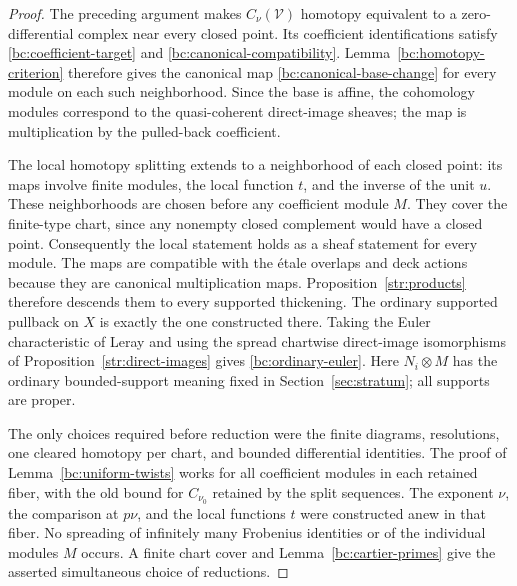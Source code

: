 \begin{proof}
The preceding argument makes $C_\nu(\mathcal V)$ homotopy equivalent
to a zero-differential complex near every closed point.  Its
coefficient identifications satisfy
\eqref{bc:coefficient-target} and
\eqref{bc:canonical-compatibility}.  Lemma~\ref{bc:homotopy-criterion}
therefore gives the canonical map \eqref{bc:canonical-base-change} for
every module on each such neighborhood.  Since the base is affine, the
cohomology modules correspond to the quasi-coherent direct-image sheaves;
the map is multiplication by the pulled-back coefficient.

The local homotopy splitting extends to a neighborhood of each closed
point: its maps involve finite modules, the local function $t$, and
the inverse of the unit $u$.  These neighborhoods are chosen before
any coefficient module $M$.  They cover the finite-type chart, since any nonempty
closed complement would have a closed point.  Consequently the local
statement holds as a sheaf statement for every module.  The maps are
compatible with the \'{e}tale overlaps and deck actions because they are
canonical multiplication maps.  Proposition~\ref{str:products}
therefore descends them to every supported thickening.  The ordinary
supported pullback on $X$ is exactly the one constructed there.
Taking the Euler characteristic of Leray and using the spread
chartwise direct-image isomorphisms of
Proposition~\ref{str:direct-images} gives \eqref{bc:ordinary-euler}.
Here $N_i\otimes M$ has the ordinary bounded-support meaning fixed in
Section~\ref{sec:stratum}; all supports are proper.

The only choices required before reduction were the finite diagrams,
resolutions, one cleared homotopy per chart, and bounded differential
identities.  The proof of Lemma~\ref{bc:uniform-twists} works for all
coefficient modules in each retained fiber, with the old bound for
$C_{\nu_0}$ retained by the split sequences.  The exponent $\nu$, the
comparison at $p\nu$, and the local functions $t$ were constructed anew
in that fiber.  No spreading of infinitely many Frobenius identities
or of the individual modules $M$ occurs.  A finite chart cover and
Lemma~\ref{bc:cartier-primes} give the asserted simultaneous choice of
reductions.
\end{proof}
